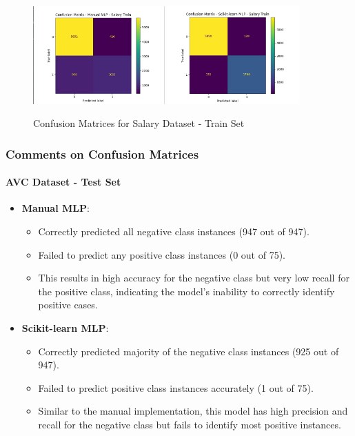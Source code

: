 \documentclass[a4paper,12pt]{article}
\begin{document}
\begin{figure}[H]
    \centering
    \includegraphics[width=0.45\textwidth]{Resources/mlp_manual_confusion_salary_train.jpeg}
    \includegraphics[width=0.45\textwidth]{Resources/mlp_scikit_confusion_salary_train.jpeg}
    \caption{Confusion Matrices for Salary Dataset - Train Set}
    \label{fig:mlp_confusion_salary_train}
\end{figure}

\subsubsection{Comments on Confusion Matrices}

\paragraph{AVC Dataset - Test Set}
\begin{itemize}
    \item \textbf{Manual MLP}:
    \begin{itemize}
        \item Correctly predicted all negative class instances (947 out of 947).
        \item Failed to predict any positive class instances (0 out of 75).
        \item This results in high accuracy for the negative class but very low recall for the positive class, indicating the model's inability to correctly identify positive cases.
    \end{itemize}
    \item \textbf{Scikit-learn MLP}:
    \begin{itemize}
        \item Correctly predicted majority of the negative class instances (925 out of 947).
        \item Failed to predict positive class instances accurately (1 out of 75).
        \item Similar to the manual implementation, this model has high precision and recall for the negative class but fails to identify most positive instances.
    \end{itemize}
\end{itemize}
\end{document}
